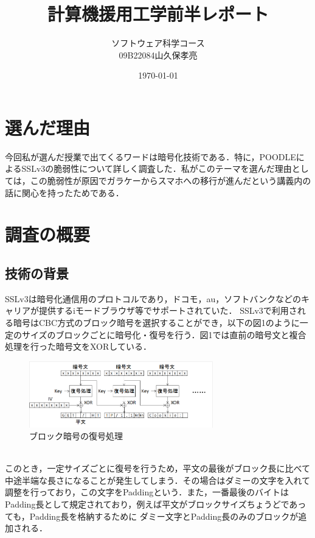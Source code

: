 \documentclass[dvipdfmx]{jarticle}
\title{計算機援用工学前半レポート}
\author{ソフトウェア科学コース\\09B22084山久保孝亮}
\date{\today}
\begin{document}
\maketitle
\section{選んだ理由}
今回私が選んだ授業で出てくるワードは暗号化技術である．特に，POODLEによるSSLv3の脆弱性について詳しく調査した．私がこのテーマを選んだ理由としては，この脆弱性が原因でガラケーからスマホへの移行が進んだという講義内の話に関心を持ったためである．
\section{調査の概要}
\subsection{技術の背景}
SSLv3は暗号化通信用のプロトコルであり，ドコモ，au，ソフトバンクなどのキャリアが提供するiモードブラウザ等でサポートされていた．\cite{0}
SSLv3で利用される暗号はCBC方式のブロック暗号を選択することができ，以下の図1のように一定のサイズのブロックごとに暗号化・復号を行う．\cite{1}図1では直前の暗号文と複合処理を行った暗号文をXORしている．
\begin{figure}[h]
    \centering
    \includegraphics[width = 8cm]{CBC.png}
    \caption{ブロック暗号の復号処理}
\end{figure}
\\このとき，一定サイズごとに復号を行うため，平文の最後がブロック長に比べて中途半端な長さになることが発生してしまう．その場合はダミーの文字を入れて調整を行っており，この文字をPaddingという．また，一番最後のバイトはPadding長として規定されており，例えば平文がブロックサイズちょうどであっても，Padding長を格納するために
ダミー文字とPadding長のみのブロックが追加される．
\end{document}
